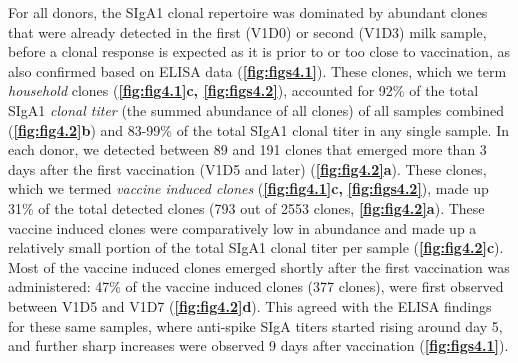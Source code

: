 For all donors, the SIgA1 clonal repertoire was dominated by abundant clones that were already detected in the first (V1D0) or second (V1D3) milk sample, before a clonal response is expected as it is prior to or too close to vaccination, as also confirmed based on ELISA data \cite{juncker2022comparing} (\textbf{\autoref{fig:figs4.1}}). These clones, which we term \emph{household} clones (\textbf{\autoref{fig:fig4.1}c, \autoref{fig:figs4.2}}), accounted for 92\% of the total SIgA1 \emph{clonal titer} (the summed abundance of all clones) of all samples combined (\textbf{\autoref{fig:fig4.2}b}) and 83-99\% of the total SIgA1 clonal titer in any single sample. In each donor, we detected between 89 and 191 clones that emerged more than 3 days after the first vaccination (V1D5 and later) (\textbf{\autoref{fig:fig4.2}a}). These clones, which we termed \emph{vaccine induced clones} (\textbf{\autoref{fig:fig4.1}c,} \textbf{\autoref{fig:figs4.2}}), made up 31\% of the total detected clones (793 out of 2553 clones, \textbf{\autoref{fig:fig4.2}a}). These vaccine induced clones were comparatively low in abundance and made up a relatively small portion of the total SIgA1 clonal titer per sample (\textbf{\autoref{fig:fig4.2}c}). Most of the vaccine induced clones emerged shortly after the first vaccination was administered: 47\% of the vaccine induced clones (377 clones), were first observed between V1D5 and V1D7 (\textbf{\autoref{fig:fig4.2}d}). This agreed with the ELISA findings for these same samples, where anti-spike SIgA titers started rising around day 5, and further sharp increases were observed 9 days after vaccination (\textbf{\autoref{fig:figs4.1}}).

